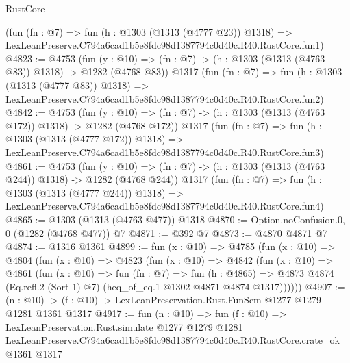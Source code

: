 \begin{lexlean}{RustCore}
\begin{coremodule}
    (fun (fn : @7) =>
    fun (h : @1303 (@1313 (@4777 @23)) @1318) =>
    LexLeanPreserve.C794a6cad1b5e8fdc98d1387794c0d40c.R40.RustCore.fun1)
@4823 := @4753
    (fun (y : @10) => (fn : @7) -> (h : @1303 (@1313 (@4763 @83)) @1318) -> @1282 (@4768 @83))
    @1317
    (fun (fn : @7) =>
    fun (h : @1303 (@1313 (@4777 @83)) @1318) =>
    LexLeanPreserve.C794a6cad1b5e8fdc98d1387794c0d40c.R40.RustCore.fun2)
@4842 := @4753
    (fun (y : @10) => (fn : @7) -> (h : @1303 (@1313 (@4763 @172)) @1318) -> @1282 (@4768 @172))
    @1317
    (fun (fn : @7) =>
    fun (h : @1303 (@1313 (@4777 @172)) @1318) =>
    LexLeanPreserve.C794a6cad1b5e8fdc98d1387794c0d40c.R40.RustCore.fun3)
@4861 := @4753
    (fun (y : @10) => (fn : @7) -> (h : @1303 (@1313 (@4763 @244)) @1318) -> @1282 (@4768 @244))
    @1317
    (fun (fn : @7) =>
    fun (h : @1303 (@1313 (@4777 @244)) @1318) =>
    LexLeanPreserve.C794a6cad1b5e8fdc98d1387794c0d40c.R40.RustCore.fun4)
@4865 := @1303 (@1313 (@4763 @477)) @1318
@4870 := Option.noConfusion.{0, 0} (@1282 (@4768 @477)) @7
@4871 := @392 @7
@4873 := @4870 @4871 @7
@4874 := @1316 @1361
@4899 := fun (x : @10) =>
  @4785
    (fun (x : @10) =>
    @4804
      (fun (x : @10) =>
      @4823
        (fun (x : @10) =>
        @4842
          (fun (x : @10) =>
          @4861
            (fun (x : @10) =>
            fun (fn : @7) =>
            fun (h : @4865) =>
            @4873 @4874 (Eq.refl.{2} (Sort 1) @7) (heq_of_eq.{1} @1302 @4871 @4874 @1317))))))
@4907 := (n : @10) -> (f : @10) -> LexLeanPreservation.Rust.FunSem @1277 @1279 @1281 @1361 @1317
@4917 := fun (n : @10) =>
  fun (f : @10) =>
  LexLeanPreservation.Rust.simulate
    @1277
    @1279
    @1281
    LexLeanPreserve.C794a6cad1b5e8fdc98d1387794c0d40c.R40.RustCore.crate_ok
    @1361
    @1317
\end{coremodule}
\end{lexlean}
